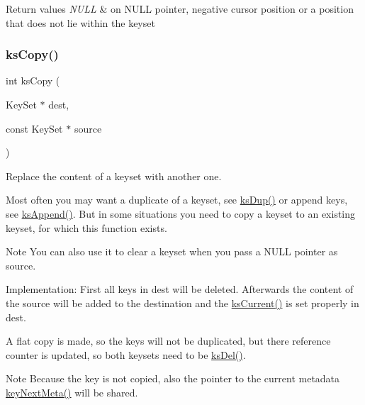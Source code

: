 \begin{DoxyRetVals}{Return values}
{\em N\+U\+LL} & on N\+U\+LL pointer, negative cursor position or a position that does not lie within the keyset \\
\hline
\end{DoxyRetVals}
\mbox{\label{group__keyset_gaba1f1dbea191f4d7e7eb3e4296ae7d5e}} 
\subsubsection{\texorpdfstring{ksCopy()}{ksCopy()}}
{\footnotesize\ttfamily int ks\+Copy (\begin{DoxyParamCaption}\item[{Key\+Set $\ast$}]{dest,  }\item[{const Key\+Set $\ast$}]{source }\end{DoxyParamCaption})}



Replace the content of a keyset with another one. 

Most often you may want a duplicate of a keyset, see \mbox{\hyperlink{group__keyset_gac59e4b328245463f1451f68d5106151c}{ks\+Dup()}} or append keys, see \mbox{\hyperlink{group__keyset_ga21eb9c3a14a604ee3a8bdc779232e7b7}{ks\+Append()}}. But in some situations you need to copy a keyset to an existing keyset, for which this function exists.

\begin{DoxyNote}{Note}
You can also use it to clear a keyset when you pass a N\+U\+LL pointer as {\ttfamily source}.
\end{DoxyNote}
\begin{DoxyParagraph}{Implementation\+:}
First all keys in {\ttfamily dest} will be deleted. Afterwards the content of the source will be added to the destination and the \mbox{\hyperlink{group__keyset_ga4287b9416912c5f2ab9c195cb74fb094}{ks\+Current()}} is set properly in {\ttfamily dest}.
\end{DoxyParagraph}
A flat copy is made, so the keys will not be duplicated, but there reference counter is updated, so both keysets need to be \mbox{\hyperlink{group__keyset_ga27e5c16473b02a422238c8d970db7ac8}{ks\+Del()}}.

\begin{DoxyNote}{Note}
Because the key is not copied, also the pointer to the current metadata \mbox{\hyperlink{group__keymeta_ga4c88342f580a4291455a801af71ce048}{key\+Next\+Meta()}} will be shared.
\end{DoxyNote}


